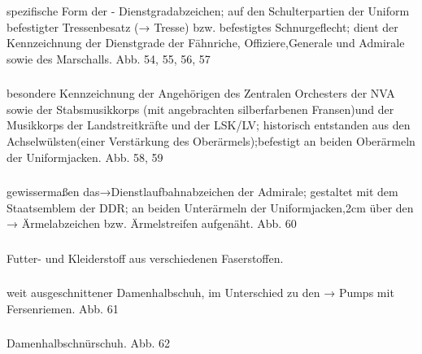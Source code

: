 \subsubsection*{}%

spezifische Form der - Dienstgradabzeichen; auf den Schulterpartien der Uniform befestigter Tressenbesatz (→ Tresse) bzw. befestigtes Schnurgeflecht; dient der Kennzeichnung der Dienstgrade der Fähnriche, Offiziere,Generale und Admirale sowie des Marschalls. Abb. 54, 55, 56, 57

\subsubsection*{}%

besondere Kennzeichnung der Angehörigen des Zentralen Orchesters der NVA sowie der Stabsmusikkorps (mit angebrachten silberfarbenen Fransen)und der Musikkorps der Landstreitkräfte und der LSK/LV; historisch entstanden aus den Achselwülsten(einer Verstärkung des Oberärmels);befestigt an beiden Oberärmeln der Uniformjacken. Abb. 58, 59

\subsubsection*{}%

gewissermaßen das→Dienstlaufbahnabzeichen der Admirale; gestaltet mit dem Staatsemblem der DDR; an beiden Unterärmeln der Uniformjacken,2cm über den → Ärmelabzeichen bzw. Ärmelstreifen aufgenäht. Abb. 60

\subsubsection*{}%

Futter- und Kleiderstoff aus verschiedenen Faserstoffen.

\subsubsection*{}%

weit ausgeschnittener Damenhalbschuh, im Unterschied zu den → Pumps mit Fersenriemen. Abb. 61

\subsubsection*{}%

Damenhalbschnürschuh. Abb. 62

